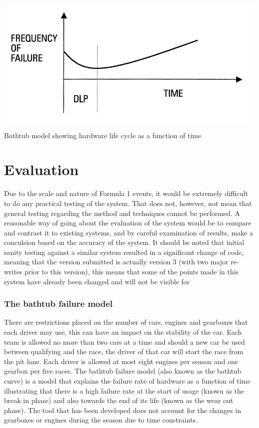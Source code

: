 \documentclass[12pt]{article} %
\begin{document}
\begin{center}
\includegraphics[width=0.7\linewidth]{bathtub}
\parbox{10cm}{\caption{Bathtub model showing hardware life cycle as a function of time}}
\end{center}

\section{Evaluation}

Due to the scale and nature of Formula 1 events, it would be extremely difficult to do any practical testing of the system. That does not, however, not mean that general testing regarding the method and techniques cannot be performed. A reasonable way of going about the evaluation of the system would be to compare and contrast it to existing systems, and by careful examination of results, make a conculsion based on the accuracy of the system. It should be noted that initial sanity testing against a similar system resulted in a significant change of code, meaning that the version submitted is actually version 3 (with two major re-writes prior to this version), this means that some of the points made in this system have already been changed and will not be visible for 

\subsubsection{The bathtub failure model}
There are restrictions placed on the number of cars, engines and gearboxes that each driver may use, this can have an impact on the stability of the car. Each team is allowed no more than two cars at a time and should a new car be used between qualifying and the race, the driver of that car will start the race from the pit lane. Each driver is allowed at most eight engines per season and one gearbox per five races. The bathtub failure model (also known as the bathtub curve) is a model that explains the failure rate of hardware as a function of time illustrating that there is a high failure rate at the start of usage (known as the break in phase) and also towards the end of its life (known as the wear out phase). The tool that has been developed does not account for the changes in gearboxes or engines during the season due to time constraints.
\end{document}
